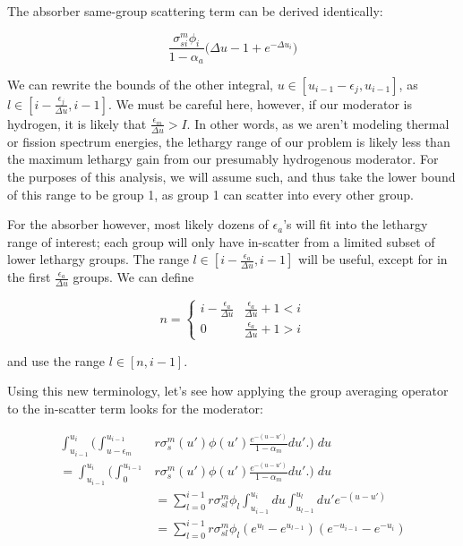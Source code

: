 \documentclass{article}
\begin{document}
         The absorber same-group scattering term can be derived identically:

         \begin{equation}
            \frac{\sigma_{si}^m \phi_i}{1-\alpha_a} \big( \Delta u -1 + e^{-\Delta u_i} \big)
         \end{equation}


         We can rewrite the bounds of the other integral, $u \in [u_{i-1} - \epsilon_{j}, u_{i-1}]$, as \\
         $l \in [ i - \frac{\epsilon_j}{\Delta u},i-1]$.  
         We must be careful here, however, if our moderator is hydrogen, 
         it is likely that $\frac{\epsilon_m}{\Delta u} > I $.
         In other words, as we aren't modeling thermal or fission spectrum energies, 
         the lethargy range of our problem is likely less than the maximum lethargy gain from
         our presumably hydrogenous moderator. 
         For the purposes of this analysis, we will assume such, and thus take the lower bound 
         of this range to be group 1, as group 1 can scatter into every other group.

         For the absorber however, most likely dozens of $\epsilon_a$'s will fit 
         into the lethargy range of interest; each group will only have in-scatter
         from a limited subset of lower lethargy groups. 
         The range
         $l \in [ i - \frac{\epsilon_a}{\Delta u},i-1]$ will be useful, 
         except for in the first  $\frac{\epsilon_a}{\Delta u}$ groups.
         We can define 

         \begin{equation}
             n = 
             \begin{cases} 
              i - \frac{\epsilon_a}{\Delta u} & \frac{\epsilon_a}{\Delta u} + 1< i \\
              0 & \frac{\epsilon_a}{\Delta u}  + 1 > i   
             \end{cases}
         \end{equation}

         and use the range 
         $l \in [ n,i-1]$. 


         Using this new terminology, let's see how applying the group averaging operator to the in-scatter
         term looks for the moderator:

         \begin{align}
             \int_{u_{i-1}}^{u_{i}} 
            \bigg(  
                \int_{u - \epsilon_m}^{u_{i-1}} &r \sigma_s^m(u')\phi(u') \frac{e^{-(u-u')}}{1 - \alpha_m}du'.
            \bigg)  \; du   \\ =
             \int_{u_{i-1}}^{u_{i}} 
            \bigg(  
                \int_{0}^{u_{i-1}} &r \sigma_s^m(u')\phi(u') \frac{e^{-(u-u')}}{1 - \alpha_m}du'.
            \bigg)  \; du   \\ &=
            \sum_{l = 0}^{i-1} r \sigma_{sl}^m \phi_l 
            \int_{u_{i-1}}^{u_{i}} du \int_{u_{l-1}}^{u_{l}} du' e^{-(u-u')} \\ &=
            \sum_{l = 0}^{i-1} r \sigma_{sl}^m \phi_l  (e^{u_l} - e^{u_{l-1}}) (e^{-u_{i-1}} - e^{-u_{i}}) 
         \end{align}
\end{document}
